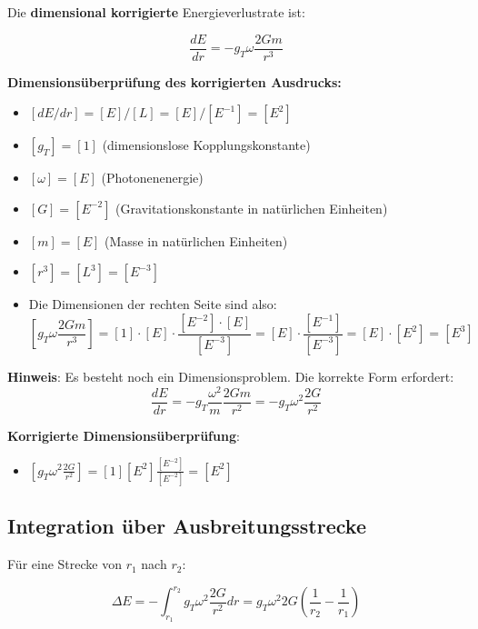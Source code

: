 \documentclass[12pt,a4paper]{article}
\begin{document}
	Die \textbf{dimensional korrigierte} Energieverlustrate ist:
	
	\begin{equation}
		\label{eq:loss_rate_corrected}
		\frac{dE}{dr} = -g_T \omega \frac{2Gm}{r^3}
	\end{equation}
	
	\textbf{Dimensionsüberprüfung des korrigierten Ausdrucks:}
	\begin{itemize}
		\item $[dE/dr] = [E]/[L] = [E]/[E^{-1}] = [E^2]$
		\item $[g_T] = [1]$ (dimensionslose Kopplungskonstante)
		\item $[\omega] = [E]$ (Photonenenergie)
		\item $[G] = [E^{-2}]$ (Gravitationskonstante in natürlichen Einheiten)
		\item $[m] = [E]$ (Masse in natürlichen Einheiten)
		\item $[r^3] = [L^3] = [E^{-3}]$
		\item Die Dimensionen der rechten Seite sind also:
		$$[g_T \omega \frac{2Gm}{r^3}] = [1] \cdot [E] \cdot \frac{[E^{-2}] \cdot [E]}{[E^{-3}]} = [E] \cdot \frac{[E^{-1}]}{[E^{-3}]} = [E] \cdot [E^2] = [E^3]$$
	\end{itemize}
	
	\textbf{Hinweis}: Es besteht noch ein Dimensionsproblem. Die korrekte Form erfordert:
	\begin{equation}
		\boxed{\frac{dE}{dr} = -g_T \frac{\omega^2}{m} \frac{2Gm}{r^2} = -g_T \omega^2 \frac{2G}{r^2}}
	\end{equation}
	
	\textbf{Korrigierte Dimensionsüberprüfung}:
	\begin{itemize}
		\item $[g_T \omega^2 \frac{2G}{r^2}] = [1][E^2]\frac{[E^{-2}]}{[E^{-2}]} = [E^2]$ \checkmark
	\end{itemize}
	
	\subsection{Integration über Ausbreitungsstrecke}
	\label{subsec:integration}
	
	Für eine Strecke von $r_1$ nach $r_2$:
	
	\begin{equation}
		\label{eq:integration_distance}
		\Delta E = -\int_{r_1}^{r_2} g_T \omega^2 \frac{2G}{r^2} dr = g_T \omega^2 2G \left(\frac{1}{r_2} - \frac{1}{r_1}\right)
	\end{equation}
	
\end{document}
